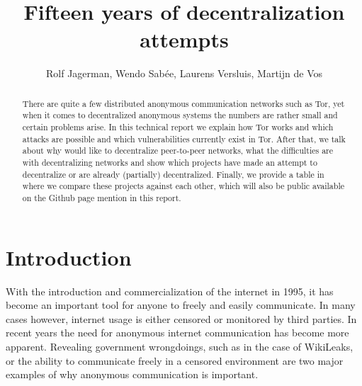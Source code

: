 \documentclass{article}
\begin{document}


\title{Fifteen years of decentralization attempts}
\author{Rolf Jagerman, Wendo Sab\'ee, Laurens Versluis, Martijn de Vos}
\date{}

\pagestyle{empty}


\maketitle
\thispagestyle{empty}

\begin{abstract}
	There are quite a few distributed anonymous communication networks such as Tor, yet when it comes to decentralized anonymous systems the numbers are rather small and certain problems arise. In this technical report we explain how Tor works and which attacks are possible and which vulnerabilities currently exist in Tor. After that, we talk about why would like to decentralize peer-to-peer networks, what the difficulties are with decentralizing networks and show which projects have made an attempt to decentralize or are already (partially) decentralized. Finally, we provide a table in where we compare these projects against each other, which will also be public available on the Github page mention in this report.
\end{abstract}


\section{Introduction}
	With the introduction and commercialization of the internet in 1995, it has become an important tool for anyone to freely and easily communicate. In many cases however, internet usage is either censored or monitored by third parties. In recent years the need for anonymous internet communication has become more apparent. Revealing government wrongdoings, such as in the case of WikiLeaks, or the ability to communicate freely in a censored environment are two major examples of why anonymous communication is important.
	
\end{document}

